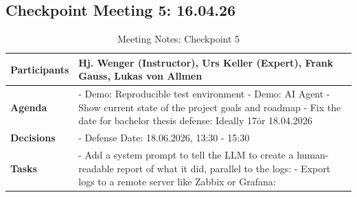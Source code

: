 \subsection{Checkpoint Meeting 5: 16.04.26}\label{subsec:checkpoint-meeting-5}

\begin{table}[H]
    \centering
    \begin{tabular}{p{2.5cm} | p{10cm}}

        \textbf{Participants} &
        Hj. Wenger (Instructor), Urs Keller (Expert), Frank Gauss, Lukas von Allmen\\[6pt]
        \hline

        \textbf{Agenda} &
        - Demo: Reproducible test environment\newline
        - Demo: \gls{AI} Agent\newline
        - Show current state of the project goals and roadmap\newline
        - Fix the date for bachelor thesis defense: Ideally 17\. or 18.04.2026\\[6pt]
        \hline

        \textbf{Decisions} &
        - Defense Date: 18.06.2026, 13:30 - 15:30\\
        \hline

        \textbf{Tasks} &
        - Add a system prompt to tell the \gls{LLM} to create a human-readable report of what it did, parallel to the logs: \newline
        - Export logs to a remote server like Zabbix or Grafana: \\
    \end{tabular}
    \caption{Meeting Notes: Checkpoint 5}
    \label{tab:meeting-notes-checkpoint-5}
\end{table}
